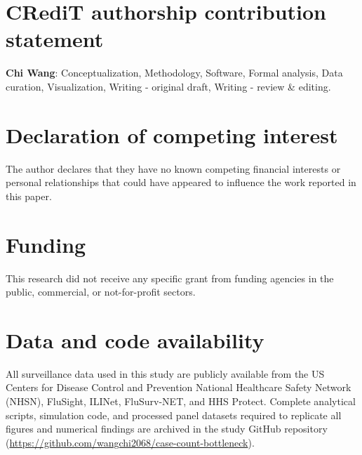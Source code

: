 \section*{CRediT authorship contribution statement}
\textbf{Chi Wang}: Conceptualization, Methodology, Software, Formal analysis, Data curation, Visualization, Writing - original draft, Writing - review \& editing.

\section*{Declaration of competing interest}
The author declares that they have no known competing financial interests or personal relationships that could have appeared to influence the work reported in this paper.

\section*{Funding}
This research did not receive any specific grant from funding agencies in the public, commercial, or not-for-profit sectors.

\section*{Data and code availability}
All surveillance data used in this study are publicly available from the US Centers for Disease Control and Prevention National Healthcare Safety Network (NHSN), FluSight, ILINet, FluSurv-NET, and HHS Protect. Complete analytical scripts, simulation code, and processed panel datasets required to replicate all figures and numerical findings are archived in the study GitHub repository (\url{https://github.com/wangchi2068/case-count-bottleneck}).
